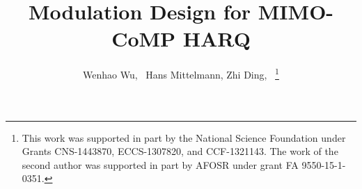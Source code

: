 \documentclass[journal]{IEEEtran}
\begin{document}
%
\title{Modulation Design for MIMO-CoMP HARQ}
%
%
%

\author{
  Wenhao Wu,~
  Hans Mittelmann,
  Zhi Ding,~
  \vspace{-1.5em} %
  \thanks{
    This work was supported in part by the National Science Foundation
    under Grants CNS-1443870, ECCS-1307820, and CCF-1321143. The work of the
    second author was supported in part by AFOSR under grant FA 9550-15-1-0351.
  }%
}

% 
%



% 
\end{document}
